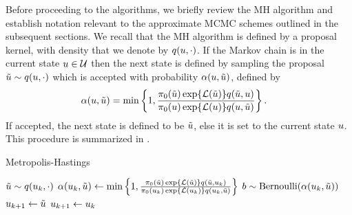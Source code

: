 \documentclass[12pt]{article}
\begin{document}
Before proceeding to the algorithms, we briefly review the MH algorithm and establish notation relevant to the 
approximate MCMC schemes outlined in the subsequent sections. 
We recall that the MH algorithm is defined by a proposal kernel, with density that we denote by 
$\propDens(\Par, \cdot)$. If the Markov chain is in the current state $\Par \in \parSpace$ then 
the next state is defined by sampling the proposal $\propPar \sim \propDens(\Par, \cdot)$ which is 
accepted with probability $\accProbMH(\Par, \propPar)$, defined by 
\begin{align}
&\accProbMH(\Par, \propPar) = 
\min\left\{1, \frac{\priorDens(\propPar) \Exp{\llik(\propPar)} \propDens(\propPar, \Par)}{\priorDens(\Par) \Exp{\llik(\Par)} \propDens(\Par, \propPar)} \right\}.
\label{MH_acc_prob_exact}
\end{align}
If accepted, the next state is defined to be $\propPar$, else it is set to the current state $\Par$. 
This procedure is summarized in . 
\begin{algorithm}
    \caption{Metropolis-Hastings}
    \label{alg:MH}
    \begin{algorithmic}[1] %
        		\State $\propPar \sim \propDens(\indexMCMC{\Par}, \cdot)$ 
		\State $\accProbMH(\indexMCMC{\Par}, \propPar) \gets \min\left\{1, \frac{\priorDens(\propPar)\Exp{\llik(\propPar)}
				\propDens(\propPar, \indexMCMC{\Par})}{\priorDens(\indexMCMC{\Par}) \Exp{\llik(\indexMCMC{\Par})}  \propDens(\indexMCMC{\Par}, \propPar)} \right\}$
		\State $b \sim \text{Bernoulli}(\accProbMH(\indexMCMC{\Par}, \propPar))$
			\State $\indexMCMC[\mcmcIndex+1]{\Par} \gets \propPar$ 
		\Else
			\State $\indexMCMC[\mcmcIndex+1]{\Par} \gets \indexMCMC{\Par}$
		\EndIf
	\EndFor
	\EndFunction
    \end{algorithmic}
\end{algorithm}
\end{document}
